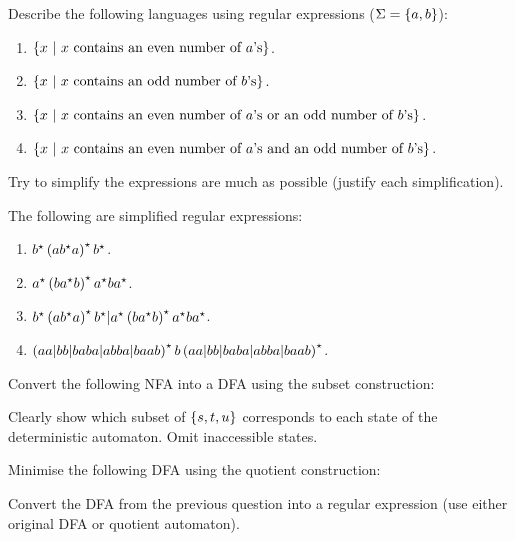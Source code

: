 \documentclass{article}
\begin{document}
\begin{exercise}
Describe the following languages using regular expressions ($\Sigma=\left\{ a,b \right\}$):
\begin{enumerate}
 \item $\left\{ x\ |\ \mbox{$x$ contains an even number of $a$'s} \right\}$.
 \item $\left\{ x\ |\ \mbox{$x$ contains an odd number of $b$'s} \right\}$.
 \item $\left\{ x\ |\ \mbox{$x$ contains an even number of $a$'s or an odd number of $b$’s} \right\}$.
 \item $\left\{ x\ |\ \mbox{$x$ contains an even number of $a$'s and an odd number of $b$’s} \right\}$.
\end{enumerate}
Try to simplify the expressions are much as possible (justify each simplification).
\begin{answer}
The following are simplified regular expressions:
\begin{enumerate}
 \item $b^{\star}\left( ab^{\star}a \right)^{\star}b^{\star}$.
 \item $a^{\star}\left( ba^{\star}b \right)^{\star}a^{\star}ba^{\star}$.
 \item $b^{\star}\left( ab^{\star}a \right)^{\star}b^{\star}|a^{\star}\left( ba^{\star}b \right)^{\star}a^{\star}ba^{\star}$.
 \item $\left( aa|bb|baba|abba|baab \right)^{\star}b\left( aa|bb|baba|abba|baab \right)^{\star}$.
\end{enumerate}
\end{answer}
\end{exercise}
\begin{exercise}
Convert the following NFA into a DFA using the subset construction:


Clearly show which subset of $\left\{ s,t,u \right\}$ corresponds to each state of the deterministic automaton. Omit inaccessible states.
\begin{answer}
\end{answer}
\end{exercise}
\begin{exercise}
Minimise the following DFA using the quotient construction:
\begin{answer}
\end{answer}
\end{exercise}
\begin{exercise}
Convert the DFA from the previous question into a regular expression (use either original DFA or quotient automaton).
\begin{answer}
\end{answer}
\end{exercise}
\end{document}

